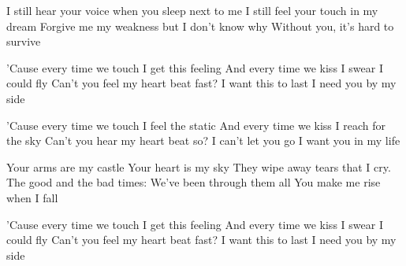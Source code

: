 \begin{verse*}
I still hear your voice
when you sleep next to me
I still feel your touch in my dream
Forgive me my weakness
but I don't know why
Without you, it's hard to survive
\end{verse*}

\begin{chorus}
'Cause every time we touch
I get this feeling
And every time we kiss
I swear I could fly
Can't you feel my heart beat fast?
I want this to last
I need you by my side
\end{chorus}

\begin{verse*}
'Cause every time we touch
I feel the static
And every time we kiss
I reach for the sky
Can't you hear my heart beat so?
I can't let you go
I want you in my life
\end{verse*}

\begin{verse*}
Your arms are my castle
Your heart is my sky
They wipe away tears that I cry.
The good and the bad times:
We've been through them all
You make me rise when I fall
\end{verse*}

\thechorus

\begin{verse*}
'Cause every time we touch
I get this feeling
And every time we kiss
I swear I could fly
Can't you feel my heart beat fast?
I want this to last
I need you by my side
\end{verse*}